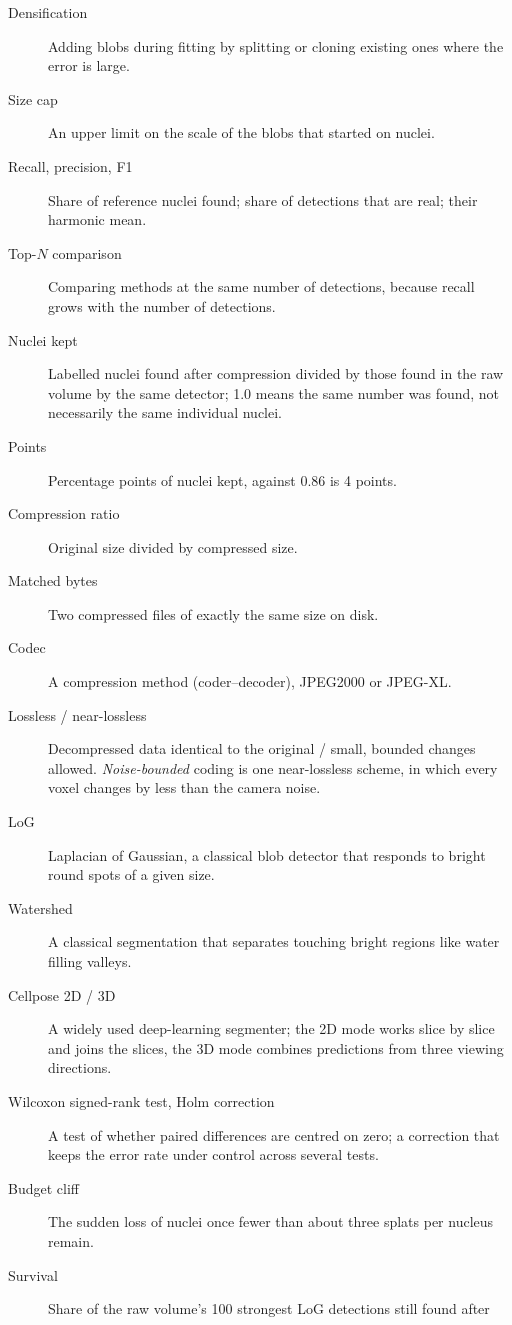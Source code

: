 \begin{description}
  \item[Densification] Adding blobs during fitting by splitting or cloning existing ones where
    the error is large.
  \item[Size cap] An upper limit on the scale of the blobs that started on nuclei.
  \item[Recall, precision, F1] Share of reference nuclei found; share of detections that are
    real; their harmonic mean.
  \item[Top-$N$ comparison] Comparing methods at the same number of detections, because recall
    grows with the number of detections.
  \item[Nuclei kept] Labelled nuclei found after compression divided by those found in the raw
    volume by the same detector; 1.0 means the same number was found, not necessarily the same
    individual nuclei.
  \item[Points] Percentage points of nuclei kept,  against 0.86 is 4 points.
  \item[Compression ratio] Original size divided by compressed size.
  \item[Matched bytes] Two compressed files of exactly the same size on disk.
  \item[Codec] A compression method (coder--decoder), \eg JPEG2000 or JPEG-XL.
  \item[Lossless / near-lossless] Decompressed data identical to the original / small, bounded
    changes allowed. \emph{Noise-bounded} coding is one near-lossless scheme, in which every
    voxel changes by less than the camera noise.
  \item[LoG] Laplacian of Gaussian, a classical blob detector that responds to bright round spots
    of a given size.
  \item[Watershed] A classical segmentation that separates touching bright regions like water
    filling valleys.
  \item[Cellpose 2D / 3D] A widely used deep-learning segmenter; the 2D mode works slice by slice
    and joins the slices, the 3D mode combines predictions from three viewing directions.
  \item[Wilcoxon signed-rank test, Holm correction] A test of whether paired differences are
    centred on zero; a correction that keeps the error rate under control across several tests.
  \item[Budget cliff] The sudden loss of nuclei once fewer than about three splats per nucleus
    remain.
  \item[Survival] Share of the raw volume's 100 strongest LoG detections still found after

\end{description}

